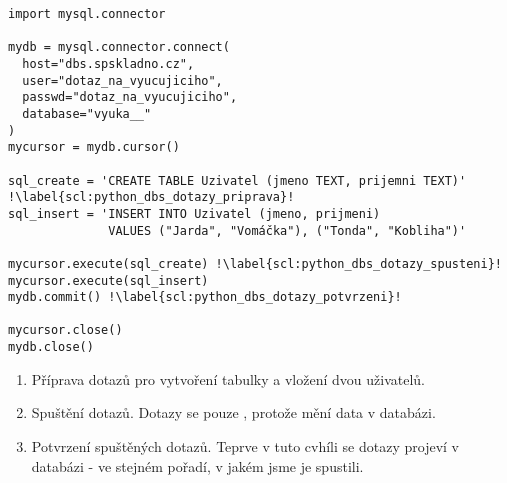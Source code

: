 \begin{minipage}[t]{.45\textwidth}
\begin{code}
\begin{verbatim}
import mysql.connector 

mydb = mysql.connector.connect( 
  host="dbs.spskladno.cz",
  user="dotaz_na_vyucujiciho",
  passwd="dotaz_na_vyucujiciho",
  database="vyuka__"
)
mycursor = mydb.cursor() 

sql_create = 'CREATE TABLE Uzivatel (jmeno TEXT, prijemni TEXT)' !\label{scl:python_dbs_dotazy_priprava}!
sql_insert = 'INSERT INTO Uzivatel (jmeno, prijmeni)
			  VALUES ("Jarda", "Vomáčka"), ("Tonda", "Kobliha")'
    
mycursor.execute(sql_create) !\label{scl:python_dbs_dotazy_spusteni}!
mycursor.execute(sql_insert) 
mydb.commit() !\label{scl:python_dbs_dotazy_potvrzeni}!

mycursor.close() 
mydb.close()
\end{verbatim}

\label{code:python_dbs_create_insert}
\end{code}
\end{minipage}
\begin{minipage}[t]{.45\textwidth}
\begin{enumerate}
\item[ř. \ref{scl:python_dbs_dotazy_priprava}:] Příprava dotazů pro vytvoření tabulky a vložení dvou uživatelů.
\item[ř. \ref{scl:python_dbs_dotazy_spusteni}:] Spuštění dotazů. Dotazy se pouze , protože mění data v databázi.
\item[ř. \ref{scl:python_dbs_dotazy_potvrzeni}:] Potvrzení spuštěných dotazů. Teprve v tuto cvhíli se dotazy projeví v databázi - ve stejném pořadí, v jakém jsme je spustili.
\end{enumerate}
\end{minipage}


